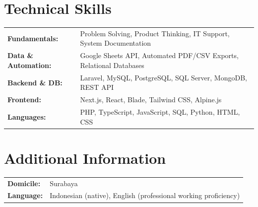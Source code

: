 \documentclass[a4paper,11pt]{article}
\begin{document}
\section{Technical Skills}
\begin{tabularx}{\textwidth}{@{}l X@{}}
\textbf{Fundamentals:} & Problem Solving, Product Thinking, IT Support, System Documentation \\[3pt]
\textbf{Data \& Automation:} & Google Sheets API, Automated PDF/CSV Exports, Relational Databases \\[3pt]
\textbf{Backend \& DB:} & Laravel, MySQL, PostgreSQL, SQL Server, MongoDB, REST API \\[3pt]
\textbf{Frontend:} & Next.js, React, Blade, Tailwind CSS, Alpine.js \\[3pt]
\textbf{Languages:} & PHP, TypeScript, JavaScript, SQL, Python, HTML, CSS \\
\end{tabularx}

\section{Additional Information}
\begin{tabularx}{\textwidth}{@{}l X@{}}
\textbf{Domicile:} & Surabaya \\[3pt]
\textbf{Language:} & Indonesian (native), English (professional working proficiency) \\
\end{tabularx}
\end{document}
